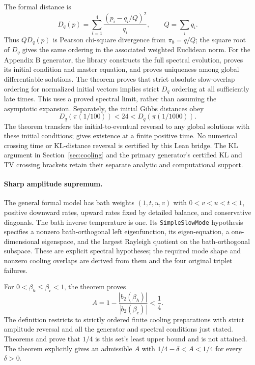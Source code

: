 \documentclass[11pt]{article}
\begin{document}
The formal distance is
\begin{equation}\label{eq:lean-distance}
 D_q(p)=\sum_{i=1}^4\frac{(p_i-q_i/Q)^2}{q_i},\qquad Q=\sum_iq_i.
\end{equation}
Thus $Q D_q(p)$ is Pearson chi-square divergence from $\pi_b=q/Q$;
the square root of $D_q$ gives the same ordering in the associated weighted
Euclidean norm. For the Appendix B generator, the library constructs the
full spectral evolution, proves its initial condition and master equation,
and proves uniqueness among global differentiable solutions. The theorem
 proves that strict
absolute slow-overlap ordering for normalized initial vectors implies strict
$D_q$ ordering at all sufficiently late times. This uses a proved spectral
limit, rather than assuming the asymptotic expansion.
Separately, the initial Gibbs distances obey
\[
 D_q(\pi(1/100))<24<D_q(\pi(1/1000)).
\]
The theorem  transfers the
initial-to-eventual reversal to any global solutions with these initial
conditions;  gives existence
at a finite positive time. No numerical crossing time or KL-distance
reversal is certified by this Lean bridge. The KL argument in
Section~\ref{sec:cooling} and the primary generator's certified KL and TV
crossing brackets retain their separate analytic and computational support.

\paragraph{Sharp amplitude supremum.}
The general formal model has bath weights $(1,t,u,v)$ with
$0<v<u<t<1$, positive downward rates, upward rates fixed by detailed balance,
and conservative diagonals. The bath inverse temperature is one.
Its \texttt{SimpleSlowMode} hypothesis specifies a nonzero bath-orthogonal
left eigenfunction, its eigen-equation, a one-dimensional eigenspace, and
the largest Rayleigh quotient on the bath-orthogonal subspace. These are
explicit spectral hypotheses; the required mode shape and nonzero cooling
overlaps are derived from them and the four original triplet failures.

For $0<\beta_h\leq\beta_c<1$, the theorem
proves
\[
 A=1-\frac{|b_2(\beta_h)|}{|b_2(\beta_c)|}<\frac14.
\]
The definition  restricts to
strictly ordered finite cooling preparations with strict amplitude reversal
and all the generator and spectral conditions just stated.
Theorems  and
 prove that $1/4$ is this
set's least upper bound and is not attained. The theorem
 explicitly gives
an admissible $A$ with $1/4-\delta<A<1/4$ for every $\delta>0$.
\end{document}
